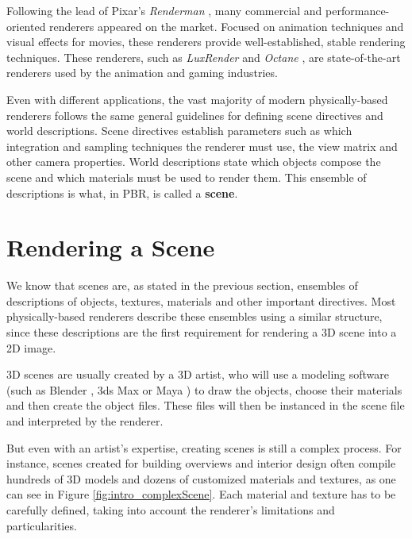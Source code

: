 Following the lead of Pixar's \textit{Renderman} \cite{renderman}, many 
commercial and performance-oriented renderers appeared on the market. Focused on 
animation techniques and visual effects for movies, these renderers provide 
well-established, stable rendering techniques. These renderers, such as 
\textit{LuxRender} \cite{luxrender} and \textit{Octane} \cite{octane}, are 
state-of-the-art renderers used by the animation and gaming industries.

Even with different applications, the vast majority of modern physically-based renderers 
follows the same general guidelines for defining scene directives and world 
descriptions. Scene directives establish parameters such as which integration 
and sampling techniques the renderer must use, the view matrix and other camera 
properties. World descriptions state which objects compose the scene and which 
materials must be used to render them. This ensemble of descriptions is what, in 
PBR, is called a \textbf{scene}.

\section{Rendering a Scene}
We know that scenes are, as stated in the previous section, ensembles of descriptions of objects, textures, materials and other important directives. Most physically-based renderers describe these ensembles using a similar structure, since these descriptions are the first requirement for rendering a 3D scene into a 2D image. 

3D scenes are usually created by a 3D artist, who will use a modeling 
software (such as Blender \cite{blender}, 3ds Max \cite{3dsmax} or Maya \cite{maya}) to draw the objects, choose their 
materials and then create the object files. These files will then be instanced 
in the scene file and interpreted by the renderer.

But even with an artist’s expertise, creating scenes is still a complex process. 
For instance, scenes created for building overviews and interior design often 
compile hundreds of 3D models and dozens of customized materials and textures, 
as one can see in Figure \ref{fig:intro_complexScene}. Each material and texture 
has to be carefully defined, taking into account the renderer's limitations and 
particularities.

